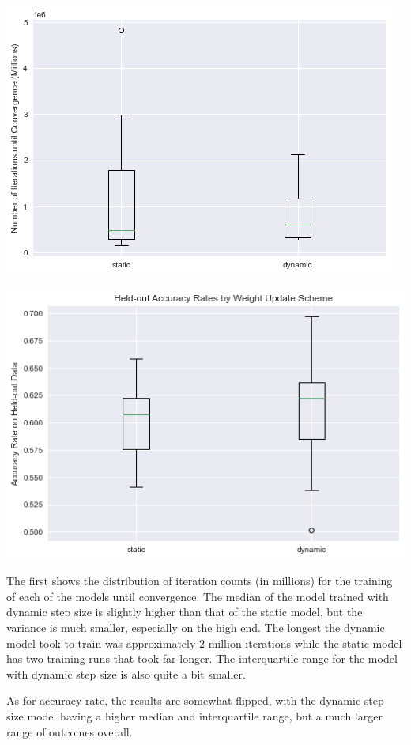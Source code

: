 \documentclass[12pt]{article}
\begin{document}
\includegraphics[scale=.7]{iter_counts.png}

\includegraphics[scale=.7]{accuracy_rates.png}

The first shows the distribution of iteration counts (in millions) for the training of each of the models until convergence. The median of the model trained with dynamic step size is slightly higher than that of the static model, but the variance is much smaller, especially on the high end. The longest the dynamic model took to train was approximately 2 million iterations while the static model has two training runs that took far longer. The interquartile range for the model with dynamic step size is also quite a bit smaller.

As for accuracy rate, the results are somewhat flipped, with the dynamic step size model having a higher median and interquartile range, but a much larger range of outcomes overall. 
\end{document}
